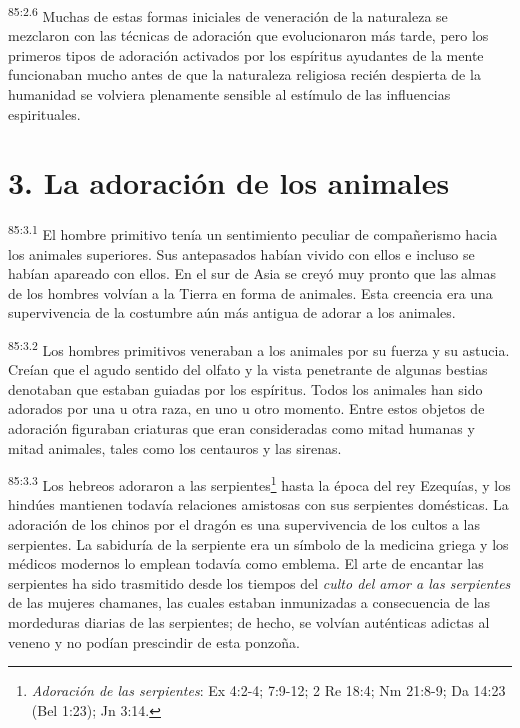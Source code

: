 \par
\textsuperscript{85:2.6} Muchas de estas formas iniciales de veneración de la naturaleza se mezclaron con las técnicas de adoración que evolucionaron más tarde, pero los primeros tipos de adoración activados por los espíritus ayudantes de la mente funcionaban mucho antes de que la naturaleza religiosa recién despierta de la humanidad se volviera plenamente sensible al estímulo de las influencias espirituales.

\section*{3. La adoración de los animales}
\par
\textsuperscript{85:3.1} El hombre primitivo tenía un sentimiento peculiar de compañerismo hacia los animales superiores. Sus antepasados habían vivido con ellos e incluso se habían apareado con ellos. En el sur de Asia se creyó muy pronto que las almas de los hombres volvían a la Tierra en forma de animales. Esta creencia era una supervivencia de la costumbre aún más antigua de adorar a los animales.

\par
\textsuperscript{85:3.2} Los hombres primitivos veneraban a los animales por su fuerza y su astucia. Creían que el agudo sentido del olfato y la vista penetrante de algunas bestias denotaban que estaban guiadas por los espíritus. Todos los animales han sido adorados por una u otra raza, en uno u otro momento. Entre estos objetos de adoración figuraban criaturas que eran consideradas como mitad humanas y mitad animales, tales como los centauros y las sirenas.

\par
\textsuperscript{85:3.3} Los hebreos adoraron a las serpientes\footnote{\textit{Adoración de las serpientes}: Ex 4:2-4; 7:9-12; 2 Re 18:4; Nm 21:8-9; Da 14:23 (Bel 1:23); Jn 3:14.} hasta la época del rey Ezequías, y los hindúes mantienen todavía relaciones amistosas con sus serpientes domésticas. La adoración de los chinos por el dragón es una supervivencia de los cultos a las serpientes. La sabiduría de la serpiente era un símbolo de la medicina griega y los médicos modernos lo emplean todavía como emblema. El arte de encantar las serpientes ha sido trasmitido desde los tiempos del \textit{culto del amor a las serpientes} de las mujeres chamanes, las cuales estaban inmunizadas a consecuencia de las mordeduras diarias de las serpientes; de hecho, se volvían auténticas adictas al veneno y no podían prescindir de esta ponzoña.

